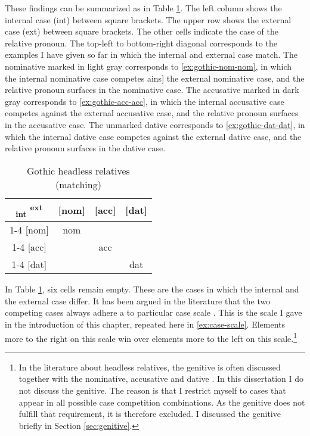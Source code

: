 These findings can be summarized as in Table \ref{tbl:summary-gothic-matching}. The left column shows the internal case (\ac{int}) between square brackets. The upper row shows the external case (\ac{ext}) between square brackets. The other cells indicate the case of the relative pronoun. The top-left to bottom-right diagonal corresponds to the examples I have given so far in which the internal and external case match. The nominative marked in light gray corresponds to \ref{ex:gothic-nom-nom}, in which the internal nominative case competes ains] the external nominative case, and the relative pronoun surfaces in the nominative case. The accusative marked in dark gray corresponds to \ref{ex:gothic-acc-acc}, in which the internal accusative case competes against the external accusative case, and the relative pronoun surfaces in the accusative case. The unmarked dative corresponds to \ref{ex:gothic-dat-dat}, in which the internal dative case competes against the external dative case, and the relative pronoun surfaces in the dative case.

\begin{table}[H]
 \center
 \caption{Gothic headless relatives (matching)}
 \begin{tabular}{c|c|c|c}
   \toprule
    \textsubscript{\ac{int}} \textsuperscript{\ac{ext}}
         & [\ac{nom}]
         & [\ac{acc}]
         & [\ac{dat}]
         \\ \cmidrule{1-4}
     [\ac{nom}]
         & \colorbox{LG}{\ac{nom}}
         &
         &
         \\ \cmidrule{1-4}
     [\ac{acc}]
         &
         & \colorbox{DG}{\ac{acc}}
         &
         \\ \cmidrule{1-4}
     [\ac{dat}]
         &
         &
         & \ac{dat}
         \\
   \bottomrule
 \end{tabular}
   \label{tbl:summary-gothic-matching}
\end{table}

In Table \ref{tbl:summary-gothic-matching}, six cells remain empty. These are the cases in which the internal and the external case differ.
It has been argued in the literature that the two competing cases always adhere a to particular case scale \citep[cf.][]{harbert1978,pittner1995,vogel2001,grosu2003,caha2019,bergsma2019}. This is the scale I gave in the introduction of this chapter, repeated here in \ref{ex:case-scale}. Elements more to the right on this scale win over elements more to the left on this scale.\footnote{
In the literature about headless relatives, the genitive is often discussed together with the nominative, accusative and dative \citep[cf.][]{harbert1978,pittner1995}. In this dissertation I do not discuss the genitive. The reason is that I restrict myself to cases that appear in all possible case competition combinations. As the genitive does not fulfill that requirement, it is therefore excluded. I discussed the genitive briefly in Section \ref{sec:genitive}.
}


